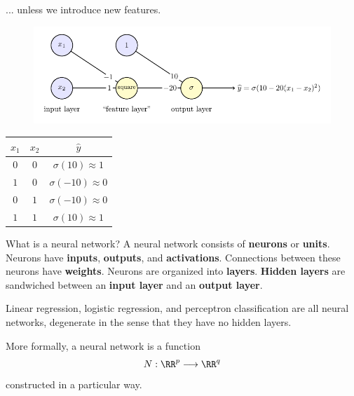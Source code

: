 \documentclass{beamer}
\newcommand{\lra}{\longrightarrow}
\begin{document}
\begin{frame}{}
    ... unless we introduce new features.
    \begin{figure}
        \includegraphics[scale=0.8]{xnor_feature/xnor_feature.pdf}
    \end{figure}

    \begin{center}
        \begin{tabular}{cc|c}
            $x_1$ & $x_2$ & $\widehat{y}$\\\hline
            $0$ & $0$ & $\sigma(10) \approx 1$\\
            $1$ & $0$ & $\sigma(-10) \approx 0$\\
            $0$ & $1$ & $\sigma(-10) \approx 0$\\
            $1$ & $1$ & $\sigma(10) \approx 1$
        \end{tabular}
    \end{center}
\end{frame}

\begin{frame}{What is a neural network?}
    A neural network consists of \textbf{neurons} or \textbf{units}.
    Neurons have \textbf{inputs}, \textbf{outputs}, and \textbf{activations}.
    Connections between these neurons have \textbf{weights}.
    Neurons are organized into \textbf{layers}. \textbf{Hidden layers}
    are sandwiched between an \textbf{input layer} and an \textbf{output layer}.

    Linear regression, logistic regression, and perceptron classification are all
    neural networks, degenerate in the sense that they have no hidden layers.
\end{frame}

\begin{frame}{}
    More formally, a neural network is a function
    \[
        N:\RR^p\lra \RR^q
    \]
    constructed in a particular way.

\end{frame}
\end{document}
